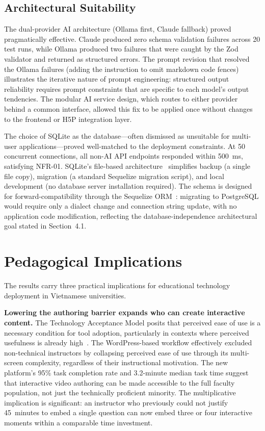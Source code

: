 \subsection{Architectural Suitability}

The dual-provider AI architecture (Ollama first, Claude fallback) proved
pragmatically effective. Claude produced zero schema validation failures
across 20 test runs, while Ollama produced two failures that were caught by
the Zod validator and returned as structured errors. The prompt revision
that resolved the Ollama failures (adding the instruction to omit markdown
code fences) illustrates the iterative nature of prompt engineering:
structured output reliability requires prompt constraints that are specific
to each model's output tendencies. The modular AI service design, which
routes to either provider behind a common interface, allowed this fix to be
applied once without changes to the frontend or H5P integration layer.

The choice of SQLite as the database---often dismissed as unsuitable for
multi-user applications---proved well-matched to the deployment constraints.
At 50 concurrent connections, all non-AI API endpoints responded within
500~ms, satisfying NFR-01. SQLite's file-based architecture~\cite{sqlite2023}
simplifies backup (a single file copy), migration (a standard Sequelize
migration script), and local development (no database server installation
required). The schema is designed for forward-compatibility through the
Sequelize ORM~\cite{sequelize2023}: migrating to PostgreSQL would require
only a dialect change and connection string update, with no application
code modification, reflecting the database-independence architectural goal
stated in Section~4.1.

\section{Pedagogical Implications}

The results carry three practical implications for educational technology
deployment in Vietnamese universities.

\textbf{Lowering the authoring barrier expands who can create interactive
content.} The Technology Acceptance Model posits that perceived ease of use
is a necessary condition for tool adoption, particularly in contexts where
perceived usefulness is already high~\cite{davis1989}. The WordPress-based
workflow effectively excluded non-technical instructors by collapsing
perceived ease of use through its multi-screen complexity, regardless of
their instructional motivation. The new platform's 95\% task completion rate
and 3.2-minute median task time suggest that interactive video authoring can
be made accessible to the full faculty population, not just the technically
proficient minority. The multiplicative implication is significant: an
instructor who previously could not justify 45~minutes to embed a single
question can now embed three or four interactive moments within a comparable
time investment.


